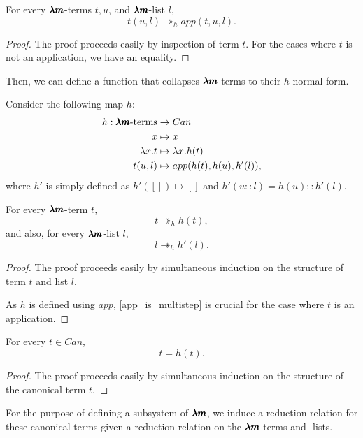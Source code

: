 \begin{lemma}
  \label{app_is_multistep}
  For every $\pmb{\lambda m}$-terms $t, u$, and $\pmb{\lambda m}$-list $l$, 
  \[ t(u, l) \twoheadrightarrow_h app(t, u, l). \]
\end{lemma}
\begin{proof}
  The proof proceeds easily by inspection of term $t$.
  For the cases where $t$ is not an application, we have an equality.
\end{proof}

Then, we can define a function that collapses $\pmb{\lambda m}$-terms to their $h$-normal form.

\begin{definition}
  Consider the following map $h$:
  \begin{align*}
    h : \pmb{\lambda m} \text{-terms} &\to Can \\
    x &\mapsto x \\
    \lambda x . t &\mapsto \lambda x . h(t) \\
    t(u,l) &\mapsto app(h(t), h(u), h'(l)),
  \end{align*}
  where $h'$ is simply defined as
  $h'([]) \mapsto []$ and $h'(u::l) = h(u)::h'(l)$.
\end{definition}

\begin{theorem}
  \label{h_is_multistep}
  For every $\pmb{\lambda m}$-term $t$,
  \[ t \twoheadrightarrow_h h(t), \]
  and also, for every $\pmb{\lambda m}$-list $l$,
  \[ l \twoheadrightarrow_h h'(l). \]
\end{theorem}
\begin{proof}
  The proof proceeds easily by simultaneous induction on the structure of term $t$ and list $l$.

  As $h$ is defined using $app$, \cref{app_is_multistep} is crucial for the case where $t$ is an application. 
\end{proof}

\begin{theorem}[$h$ surjectivity]
  \label{h_is_surjective}
  For every $t \in Can$,
  \[ t = h(t). \]
\end{theorem}
\begin{proof}
  The proof proceeds easily by simultaneous induction on the structure of the canonical term $t$.
\end{proof}

For the purpose of defining a subsystem of $\pmb{\lambda m}$, we induce a reduction relation for these canonical terms given a reduction relation on the $\pmb{\lambda m}$-terms and -lists.

